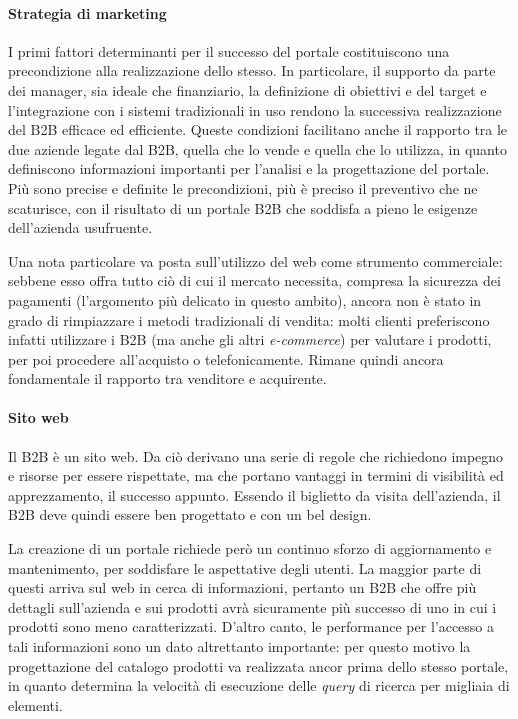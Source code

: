 \paragraph{Strategia di marketing}
I primi fattori determinanti per il successo del portale costituiscono una precondizione alla realizzazione dello stesso. In particolare, il supporto da parte dei manager, sia ideale che finanziario, la definizione di obiettivi e del target e l'integrazione con i sistemi tradizionali in uso rendono la successiva realizzazione del B2B efficace ed efficiente. Queste condizioni facilitano anche il rapporto tra le due aziende legate dal B2B, quella che lo vende e quella che lo utilizza, in quanto definiscono informazioni importanti per l'analisi e la progettazione del portale. Più sono precise e definite le precondizioni, più è preciso il preventivo che ne scaturisce, con il risultato di un portale B2B che soddisfa a pieno le esigenze dell'azienda usufruente.

Una nota particolare va posta sull'utilizzo del web come strumento commerciale: sebbene esso offra tutto ciò di cui il mercato necessita, compresa la sicurezza dei pagamenti (l'argomento più delicato in questo ambito), ancora non è stato in grado di rimpiazzare i metodi tradizionali di vendita: molti clienti preferiscono infatti utilizzare i B2B (ma anche gli altri \textit{e-commerce}) per valutare i prodotti, per poi procedere all'acquisto  o telefonicamente. Rimane quindi ancora fondamentale il rapporto tra venditore e acquirente.

\paragraph{Sito web}
Il B2B è un sito web. Da ciò derivano una serie di regole che richiedono impegno e risorse per essere rispettate, ma che portano vantaggi in termini di visibilità ed apprezzamento, il successo appunto. Essendo il biglietto da visita dell'azienda, il B2B deve quindi essere ben progettato e con un bel design.
	
La creazione di un portale richiede però un continuo sforzo di aggiornamento e mantenimento, per soddisfare le aspettative degli utenti. La maggior parte di questi arriva sul web in cerca di informazioni, pertanto un B2B che offre più dettagli sull'azienda e sui prodotti avrà sicuramente più successo di uno in cui i prodotti sono meno caratterizzati. D'altro canto, le performance per l'accesso a tali informazioni sono un dato altrettanto importante: per questo motivo la progettazione del catalogo prodotti va realizzata ancor prima dello stesso portale, in quanto determina la velocità di esecuzione delle \textit{query} di ricerca per migliaia di elementi.
	
